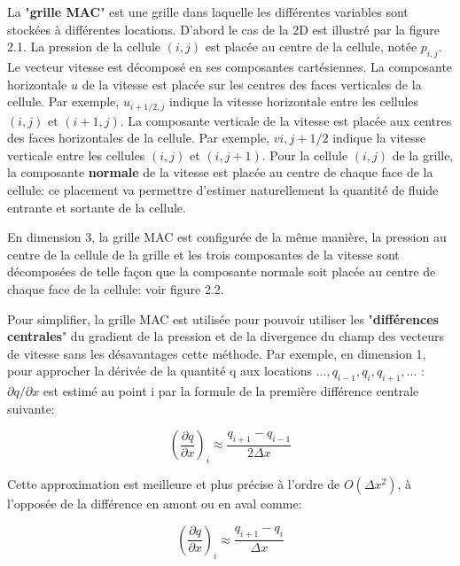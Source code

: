 \documentclass[11pt]{report}
\begin{document}
La "\textbf{grille MAC}" est une grille dans laquelle les différentes variables sont stockées à différentes locations. D'abord le cas de la 2D est illustré par la figure 2.1. La pression de la cellule $(i, j)$ est placée au centre de la cellule, notée $p_{i,j}$. Le vecteur vitesse est décomposé en ses composantes cartésiennes. La composante horizontale $ u $ de la vitesse est placée sur les centres des faces verticales de la cellule. Par exemple, $ u_{i+1/2, j} $ indique la vitesse horizontale entre les cellules $(i, j)$ et $(i+1, j)$. La composante verticale de la vitesse est placée aux centres des faces horizontales de la cellule. Par exemple, $ v{i, j+1/2} $ indique la vitesse verticale entre les cellules $ (i, j) $ et $(i, j+1)$. Pour la cellule $(i, j)$ de la grille, la composante \textbf{normale} de la vitesse est placée au centre de chaque face de la cellule: ce placement va permettre d'estimer naturellement la quantité de fluide entrante et sortante de la cellule. \newline

En dimension 3, la grille MAC est configurée de la même manière, la pression au centre de la cellule de la grille et les trois composantes de la vitesse sont décomposées de telle façon que la composante normale soit placée au centre de chaque face de la cellule: voir figure 2.2. \newline

Pour simplifier, la grille MAC est utilisée pour pouvoir utiliser les "\textbf{différences centrales}" du gradient de la pression et de la divergence du champ des vecteurs de vitesse sans les désavantages cette méthode. Par exemple, en dimension 1,  pour approcher la dérivée de la quantité q aux locations $..., q_{i-1}, q_{i}, q_{i+1}, ...$ : $ \partial q/\partial x$ est estimé au point i par la formule de la première différence centrale suivante:

\begin{equation}
\left(\frac{\partial q}{\partial x}\right)_i \approx \frac{q_{i+1} - q_{i-1}}{2 \Delta x}
\end{equation}

Cette approximation est meilleure et plus précise à l'ordre de $ O(\Delta x^2)$, à l'opposée de la différence en amont ou en aval comme:

\begin{equation}
\left(\frac{\partial q}{\partial x}\right)_i \approx \frac{q_{i+1} - q_{i}}{\Delta x}
\end{equation}
\end{document}
